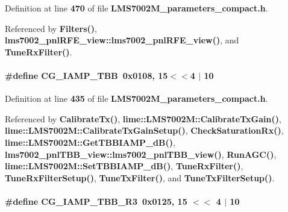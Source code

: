Definition at line {\bf 470} of file {\bf L\+M\+S7002\+M\+\_\+parameters\+\_\+compact.\+h}.



Referenced by {\bf Filters()}, {\bf lms7002\+\_\+pnl\+R\+F\+E\+\_\+view\+::lms7002\+\_\+pnl\+R\+F\+E\+\_\+view()}, and {\bf Tune\+Rx\+Filter()}.

\paragraph[{C\+G\+\_\+\+I\+A\+M\+P\+\_\+\+T\+BB}]{\setlength{\rightskip}{0pt plus 5cm}\#define C\+G\+\_\+\+I\+A\+M\+P\+\_\+\+T\+BB~0x0108, 15$<$$<$4 $\vert$  10}\label{LMS7002M__parameters__compact_8h_ab1d8ac7119e41d2b6d639e08c83d2f85}


Definition at line {\bf 435} of file {\bf L\+M\+S7002\+M\+\_\+parameters\+\_\+compact.\+h}.



Referenced by {\bf Calibrate\+Tx()}, {\bf lime\+::\+L\+M\+S7002\+M\+::\+Calibrate\+Tx\+Gain()}, {\bf lime\+::\+L\+M\+S7002\+M\+::\+Calibrate\+Tx\+Gain\+Setup()}, {\bf Check\+Saturation\+Rx()}, {\bf lime\+::\+L\+M\+S7002\+M\+::\+Get\+T\+B\+B\+I\+A\+M\+P\+\_\+d\+B()}, {\bf lms7002\+\_\+pnl\+T\+B\+B\+\_\+view\+::lms7002\+\_\+pnl\+T\+B\+B\+\_\+view()}, {\bf Run\+A\+G\+C()}, {\bf lime\+::\+L\+M\+S7002\+M\+::\+Set\+T\+B\+B\+I\+A\+M\+P\+\_\+d\+B()}, {\bf Tune\+Rx\+Filter()}, {\bf Tune\+Rx\+Filter\+Setup()}, {\bf Tune\+Tx\+Filter()}, and {\bf Tune\+Tx\+Filter\+Setup()}.

\paragraph[{C\+G\+\_\+\+I\+A\+M\+P\+\_\+\+T\+B\+B\+\_\+\+R3}]{\setlength{\rightskip}{0pt plus 5cm}\#define C\+G\+\_\+\+I\+A\+M\+P\+\_\+\+T\+B\+B\+\_\+\+R3~0x0125, 15 $<$$<$ 4 $\vert$ 10}\label{LMS7002M__parameters__compact_8h_a302f6636387dd88481f1a4772d76009b}


